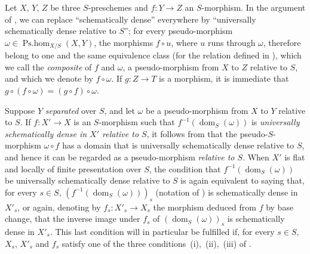 \begin{env}[20.5.5]
\label{IV.20.5.5}
Let $X$, $Y$, $Z$ be three $S$-preschemes and $f:Y\to Z$ an $S$-morphism.
In the argument of , we can replace ``schematically dense'' everywhere by ``universally schematically dense relative to $S$''; for every pseudo-morphism $\omega\in\operatorname{Ps.hom}_{X/S}(X,Y)$, the morphisms $f\circ u$, where $u$ runs through $\omega$, therefore belong to one and the same equivalence class (for the relation defined in ), which we
call the \emph{composite} of $f$ and $\omega$, a pseudo-morphism from $X$ to $Z$ relative to $S$, and which we denote by $f\circ\omega$.
If $g:Z\to T$ is a morphism, it is immediate that $g\circ(f\circ\omega)=(g\circ f)\circ\omega$.
\end{env}

\begin{env}[20.5.6]
\label{IV.20.5.6}
Suppose $Y$ \emph{separated} over $S$, and let $\omega$ be a pseudo-morphism from $X$ to $Y$ relative to $S$.
If $f:X'\to X$ is an $S$-morphism such that $f^{-1}(\operatorname{dom}_S(\omega))$ is \emph{universally schematically dense in $X'$ relative to $S$}, it follows from  that the pseudo-$S$-morphism $\omega\circ f$ has a domain that is universally schematically dense relative to $S$, and hence  it can be regarded as a pseudo-morphism \emph{relative to $S$}.
When $X'$ is flat and locally of finite presentation over $S$, the condition that $f^{-1}(\operatorname{dom}_S(\omega))$ be universally schematically dense relative to $S$ is again equivalent to saying that, for every $s\in S$, $(f^{-1}(\operatorname{dom}_S(\omega)))_s$ (notation of ) is schematically dense in $X'_s$, or again, denoting by $f_s:X'_s\to X_s$ the morphism deduced from $f$ by base change, that the inverse image under $f_s$ of $(\operatorname{dom}_S(\omega))_s$ is schematically dense in $X'_s$.
This last condition will in particular be fulfilled if, for every $s\in S$, $X_s$, $X'_s$ and $f_s$ satisfy one of the three conditions~(i),~(ii),~(iii) of .
\end{env}

